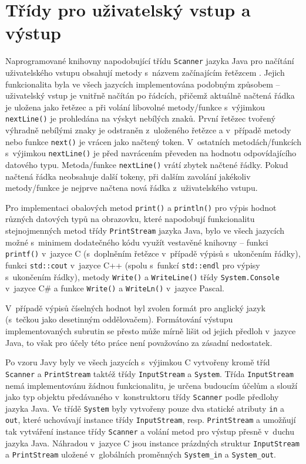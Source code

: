 \documentclass[czech,BP]{thesiskiv}
\begin{document}
\section{Třídy pro uživatelský vstup a výstup}
Naprogramované knihovny napodobující třídu \texttt{Scanner} jazyka Java pro načítání uživatelského vstupu obsahují metody s~názvem začínajícím řetězcem . Jejich funkcionalita byla ve všech jazycích implementována podobným způsobem -- uživatelský vstup je vnitřně načítán po řádcích, přičemž aktuálně načtená řádka je uložena jako řetězec a při volání libovolné metody/funkce s~výjimkou \texttt{nextLine()} je prohledána na výskyt nebílých znaků. První řetězec tvořený výhradně nebílými znaky je odstraněn z~uloženého řetězce a v~případě metody nebo funkce \texttt{next()} je vrácen jako načtený token. V~ostatních metodách/funkcích s~výjimkou \texttt{nextLine()} je před navrácením převeden na hodnotu odpovídajícího datového typu. Metoda/funkce \texttt{nextLine()} vrátí zbytek načtené řádky. Pokud načtená řádka neobsahuje další tokeny, při dalším zavolání jakékoliv metody/funkce  je nejprve načtena nová řádka z~uživatelského vstupu.\par
Pro implementaci obalových metod \texttt{print()} a \texttt{println()} pro výpis hodnot různých datových typů na obrazovku, které napodobují funkcionalitu stejnojmenných metod třídy \texttt{PrintStream} jazyka Java, bylo ve všech jazycích možné s~minimem dodatečného kódu využít vestavěné knihovny -- funkci \texttt{printf()} v~jazyce C (s~doplněním řetězce  v~případě výpisů s~ukončením řádky), funkci \texttt{std::cout} v~jazyce C++ (spolu s~funkcí \texttt{std::endl} pro výpisy s~ukončením řádky), metody \texttt{Write()} a \texttt{WriteLine()} třídy \texttt{System.Console} v~jazyce C\# a funkce \texttt{Write()} a \texttt{WriteLn()} v~jazyce Pascal.\par
V~případě výpisů číselných hodnot byl zvolen formát pro anglický jazyk (s~tečkou  jako desetinným oddělovačem). Formátování výstupu implementovaných subrutin se přesto může mírně lišit od jejich předloh v~jazyce Java, to však pro účely této práce není považováno za zásadní nedostatek.\par
Po vzoru Javy byly ve všech jazycích s~výjimkou C vytvořeny kromě tříd \texttt{Scanner} a \texttt{PrintStream} taktéž třídy \texttt{InputStream} a \texttt{System}. Třída \texttt{InputStream} nemá implementovánu žádnou funkcionalitu, je určena budoucím účelům a slouží jako typ objektu předávaného v~konstruktoru třídy \texttt{Scanner} podle předlohy jazyka Java. Ve třídě \texttt{System} byly vytvořeny pouze dva statické atributy \texttt{in} a \texttt{out}, které uchovávají instance třídy \texttt{InputStream}, resp. \texttt{PrintStream} a umožňují tak vytváření instance třídy \texttt{Scanner} a volání metod pro výstup přesně v~duchu jazyka Java. Náhradou v~jazyce C jsou instance prázdných struktur \texttt{InputStream} a \texttt{PrintStream} uložené v~globálních proměnných \texttt{System\_in} a \texttt{System\_out}.
\end{document}
